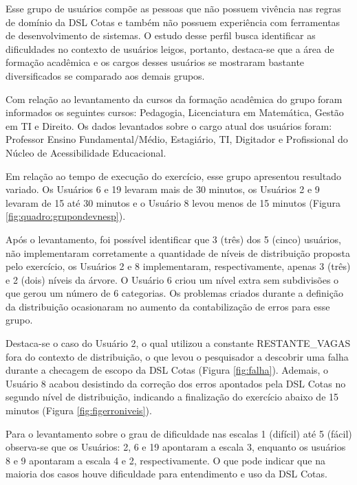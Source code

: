Esse grupo de usuários compõe as pessoas que não possuem vivência nas regras de domínio da DSL Cotas e também não possuem experiência com ferramentas de desenvolvimento de sistemas. O estudo desse perfil busca identificar as dificuldades no contexto de usuários leigos, portanto, destaca-se que a área de formação acadêmica e os cargos desses usuários se mostraram bastante diversificados se comparado aos demais grupos.

Com relação ao levantamento da cursos da formação acadêmica do grupo foram informados os seguintes cursos: Pedagogia, Licenciatura em Matemática, Gestão em TI e Direito. Os dados levantados sobre o cargo atual dos usuários foram: Professor Ensino Fundamental/Médio, Estagiário, TI, Digitador e Profissional do Núcleo de Acessibilidade Educacional.

Em relação ao tempo de execução do exercício, esse grupo apresentou resultado variado. Os Usuários 6 e 19 levaram mais de 30 minutos, os Usuários 2 e 9 levaram de 15 até 30 minutos e o Usuário 8 levou menos de 15 minutos (Figura \ref{fig:quadro:grupondevnesp}). 



Após o levantamento, foi possível identificar que 3 (três) dos 5 (cinco) usuários, não implementaram corretamente a quantidade de níveis de distribuição proposta pelo exercício, os Usuários 2 e 8 implementaram, respectivamente, apenas 3 (três) e 2 (dois) níveis da árvore. O Usuário 6 criou um nível extra sem subdivisões o que gerou um número de 6 categorias. Os problemas criados durante a definição da distribuição ocasionaram no aumento da contabilização de erros para esse grupo. 

Destaca-se o caso do Usuário 2, o qual utilizou a constante RESTANTE\_VAGAS fora do contexto de distribuição, o que levou o pesquisador a descobrir uma falha durante a checagem de escopo da DSL Cotas (Figura \ref{fig:falha}). Ademais, o Usuário 8 acabou desistindo da correção dos erros apontados pela DSL Cotas no segundo nível de distribuição, indicando a finalização do exercício abaixo de 15 minutos (Figura \ref{fig:figerroniveis}).





\newpage
Para o levantamento sobre o grau de dificuldade nas escalas 1 (difícil) até 5 (fácil) observa-se que os Usuários: 2, 6 e 19 apontaram a escala 3, enquanto os usuários 8 e 9 apontaram a escala 4 e 2, respectivamente. O que pode indicar que na maioria dos casos houve dificuldade para entendimento e uso da DSL Cotas.

